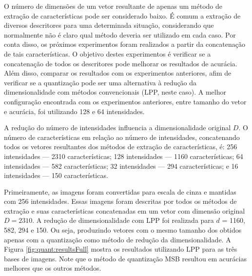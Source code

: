 O número de dimensões de um vetor resultante de apenas um método de extração de características pode ser considerado baixo. É comum a extração de diversos descritores para uma determinada situação, considerando que normalmente não é claro qual método deveria ser utilizado em cada caso. Por conta disso, os próximos experimentos foram realizados a partir da concatenação de tais características. O objetivo destes experimentos é verificar se a concatenação de todos os descritores pode melhorar os resultados de acurácia. Além disso, comparar os resultados com os experimentos anteriores, afim de verificar se a quantização pode ser uma alternativa à redução da dimensionalidade com métodos convencionais (LPP, neste caso). A melhor configuração encontrada com os experimentos anteriores, entre tamanho do vetor e acurácia, foi utilizando 128 e 64 intensidades.

A redução do número de intensidades influencia a dimensionalidade original $D$. O número de características em relação ao número de intensidades, concatenando todos os vetores resultantes dos métodos de extração de características, é: 256 intensidades --- 2310 características; 128 intensidades --- 1160 características; 64 intensidades --- 582 características; 32 intensidades --- 294 características; e 16 intensidades --- 150 características.

Primeiramente, as imagens foram convertidas para escala de cinza e mantidas com 256 intensidades. Essas imagens foram descritas por todos os métodos de extração e suas características concatenadas em um vetor com dimensão original $D=2310$. A redução de dimensionalidade com LPP foi realizada para $d$ = 1160, 582, 294 e 150. Ou seja, produzindo vetores com o mesmo tamanho dos obtidos apenas com a quantização como método de redução da dimensionalidade. A Figura \ref{fig:quant:resultsFull} mostra os resultados utilizando LPP para as três bases de imagens. Note que o método de quantização MSB resultou em acurácias melhores que os outros métodos.

